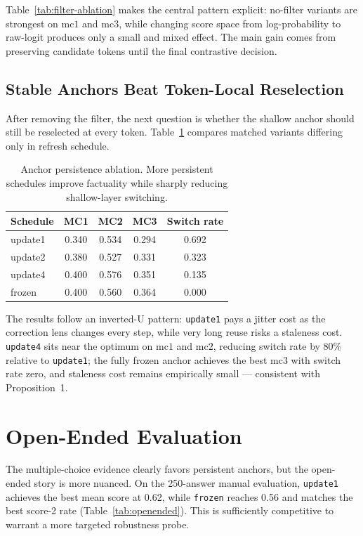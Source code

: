 \documentclass[10pt,twocolumn,letterpaper]{article}
\begin{document}
Table~\ref{tab:filter-ablation} makes the central pattern explicit: no-filter variants are strongest on $\mathrm{mc1}$ and $\mathrm{mc3}$, while changing score space from log-probability to raw-logit produces only a small and mixed effect. The main gain comes from preserving candidate tokens until the final contrastive decision.

\subsection{Stable Anchors Beat Token-Local Reselection}
After removing the filter, the next question is whether the shallow anchor should still be reselected at every token. Table~\ref{tab:persistence} compares matched variants differing only in refresh schedule.

\begin{table}[t]
    \centering
    \small
    \begin{tabular}{lcccc}
        \toprule
        Schedule & MC1 & MC2 & MC3 & Switch rate \\
        \midrule
        update1 & 0.340 & 0.534 & 0.294 & 0.692 \\
        update2 & 0.380 & 0.527 & 0.331 & 0.323 \\
        update4 & 0.400 & 0.576 & 0.351 & 0.135 \\
        frozen  & 0.400 & 0.560 & 0.364 & 0.000 \\
        \bottomrule
    \end{tabular}
    \caption{Anchor persistence ablation. More persistent schedules improve factuality while sharply reducing shallow-layer switching.}
    \label{tab:persistence}
\end{table}

The results follow an inverted-U pattern: \texttt{update1} pays a jitter cost as the correction lens changes every step, while very long reuse risks a staleness cost. \texttt{update4} sits near the optimum on $\mathrm{mc1}$ and $\mathrm{mc2}$, reducing switch rate by 80\% relative to \texttt{update1}; the fully frozen anchor achieves the best $\mathrm{mc3}$ with switch rate zero, and staleness cost remains empirically small --- consistent with Proposition~1.

\section{Open-Ended Evaluation}
The multiple-choice evidence clearly favors persistent anchors, but the open-ended story is more nuanced. On the 250-answer manual evaluation, \texttt{update1} achieves the best mean score at 0.62, while \texttt{frozen} reaches 0.56 and matches the best score-2 rate (Table~\ref{tab:openended}). This is sufficiently competitive to warrant a more targeted robustness probe.
\end{document}
